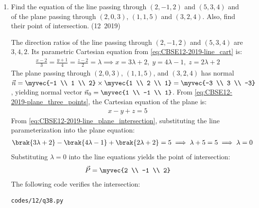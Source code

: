 \begin{enumerate}[label=\thesubsection.\arabic*, ref=\thesubsection.\theenumi]
\item Find the equation of the line passing through $(2,-1,2)$ and $(5,3,4)$ and of the plane passing through $(2,0,3)$, $(1,1,5)$ and $(3,2,4)$. Also, find their point of intersection.
\hfill (12~2019)

\solution
The direction ratios of the line passing through $(2, -1, 2)$ and $(5, 3, 4)$ are $3, 4, 2$. Its parametric Cartesian equation from \eqref{eq:CBSE12-2019-line_cart} is:
\begin{align}
	\frac{x - 2}{3} = \frac{y + 1}{4} = \frac{z - 2}{2} = \lambda \implies x = 3\lambda + 2, \; y = 4\lambda - 1, \; z = 2\lambda + 2
\end{align}
The plane passing through $(2, 0, 3)$, $(1, 1, 5)$, and $(3, 2, 4)$ has normal $\vec{n} = \myvec{-1 \\ 1 \\ 2} \times \myvec{1 \\ 2 \\ 1} = \myvec{-3 \\ 3 \\ -3}$, yielding normal vector $\vec{n}_0 = \myvec{1 \\ -1 \\ 1}$.
From \eqref{eq:CBSE12-2019-plane_three_points}, the Cartesian equation of the plane is:
\begin{align}
	x - y + z = 5
\end{align}
From \eqref{eq:CBSE12-2019-line_plane_intersection}, substituting the line parameterization into the plane equation:
\begin{align}
	\brak{3\lambda + 2} - \brak{4\lambda - 1} + \brak{2\lambda + 2} = 5 \implies \lambda + 5 = 5 \implies \lambda = 0
\end{align}
Substituting $\lambda = 0$ into the line equations yields the point of intersection:
\begin{align}
	\vec{P} = \myvec{2 \\ -1 \\ 2}
\end{align}
The following code verifies the intersection:
\begin{lstlisting}[frame=single, basicstyle=\ttfamily\small]
	codes/12/q38.py
\end{lstlisting}

\end{enumerate}


